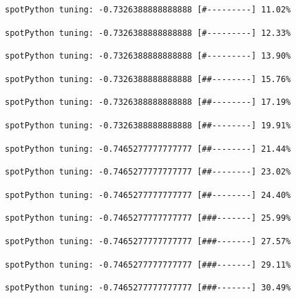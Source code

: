 \documentclass[
  letterpaper,
  DIV=11,
  numbers=noendperiod]{scrreprt}
\begin{document}
\begin{verbatim}
spotPython tuning: -0.7326388888888888 [#---------] 11.02% 
\end{verbatim}

\begin{verbatim}
spotPython tuning: -0.7326388888888888 [#---------] 12.33% 
\end{verbatim}

\begin{verbatim}
spotPython tuning: -0.7326388888888888 [#---------] 13.90% 
\end{verbatim}

\begin{verbatim}
spotPython tuning: -0.7326388888888888 [##--------] 15.76% 
\end{verbatim}

\begin{verbatim}
spotPython tuning: -0.7326388888888888 [##--------] 17.19% 
\end{verbatim}

\begin{verbatim}
spotPython tuning: -0.7326388888888888 [##--------] 19.91% 
\end{verbatim}

\begin{verbatim}
spotPython tuning: -0.7465277777777777 [##--------] 21.44% 
\end{verbatim}

\begin{verbatim}
spotPython tuning: -0.7465277777777777 [##--------] 23.02% 
\end{verbatim}

\begin{verbatim}
spotPython tuning: -0.7465277777777777 [##--------] 24.40% 
\end{verbatim}

\begin{verbatim}
spotPython tuning: -0.7465277777777777 [###-------] 25.99% 
\end{verbatim}

\begin{verbatim}
spotPython tuning: -0.7465277777777777 [###-------] 27.57% 
\end{verbatim}

\begin{verbatim}
spotPython tuning: -0.7465277777777777 [###-------] 29.11% 
\end{verbatim}

\begin{verbatim}
spotPython tuning: -0.7465277777777777 [###-------] 30.49% 
\end{verbatim}
\end{document}
